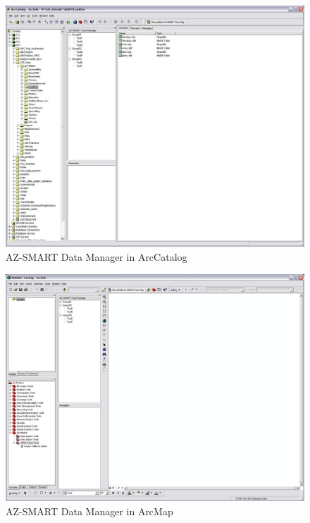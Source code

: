 
\begin{figure}
\begin{center}
\includegraphics[scale=0.3]{figures/AZ-SMART_DataManager_in_ArcCatalog.jpg}
\caption{AZ-SMART Data Manager in ArcCatalog}
\label{figDataManagerArcCatlog}
\end{center}
\end{figure}

\begin{figure}
\begin{center}
\includegraphics[scale=0.3]{figures/AZ-SMART_DataManager_in_ArcMap.jpg}
\caption{AZ-SMART Data Manager in ArcMap}
\label{figDataManagerArcMap}
\end{center}
\end{figure}


